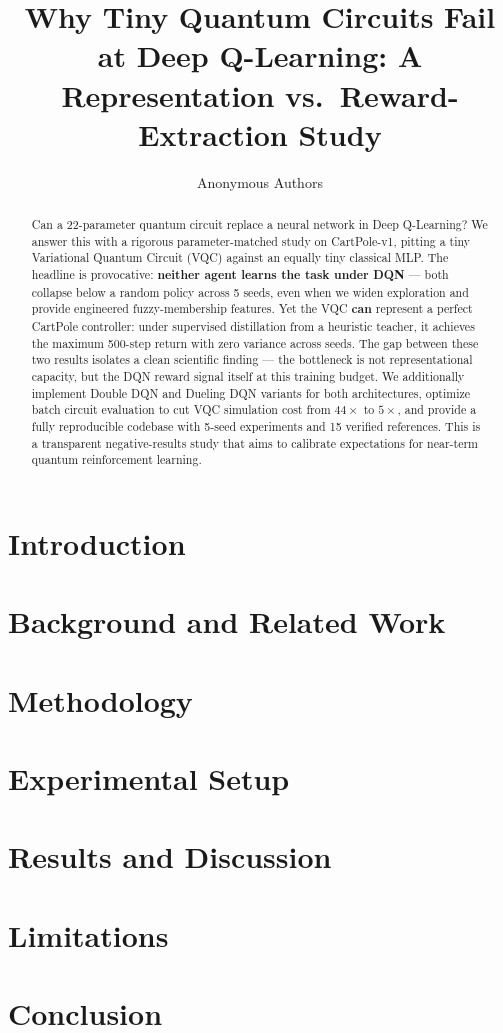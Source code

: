 \documentclass[12pt]{article}
\title{Why Tiny Quantum Circuits Fail at Deep Q-Learning: A Representation vs.\ Reward-Extraction Study}
\author{Anonymous Authors}
\begin{document}
\maketitle

\begin{abstract}
Can a 22-parameter quantum circuit replace a neural network in Deep Q-Learning?
We answer this with a rigorous parameter-matched study on CartPole-v1, pitting
a tiny Variational Quantum Circuit (VQC) against an equally tiny classical MLP.
The headline is provocative: \textbf{neither agent learns the task under DQN} —
both collapse below a random policy across 5 seeds, even when we widen
exploration and provide engineered fuzzy-membership features. Yet the VQC
\textbf{can} represent a perfect CartPole controller: under supervised
distillation from a heuristic teacher, it achieves the maximum 500-step return
with zero variance across seeds. The gap between these two results isolates a
clean scientific finding — the bottleneck is not representational capacity, but
the DQN reward signal itself at this training budget. We additionally implement
Double DQN and Dueling DQN variants for both architectures, optimize batch
circuit evaluation to cut VQC simulation cost from $44\times$ to $5\times$, and
provide a fully reproducible codebase with 5-seed experiments and 15 verified
references. This is a transparent negative-results study that aims to calibrate
expectations for near-term quantum reinforcement learning.
\end{abstract}


\section{Introduction}


\section{Background and Related Work}


\section{Methodology}


\section{Experimental Setup}


\section{Results and Discussion}


\section{Limitations}


\section{Conclusion}



\footnotesize

\end{document}
